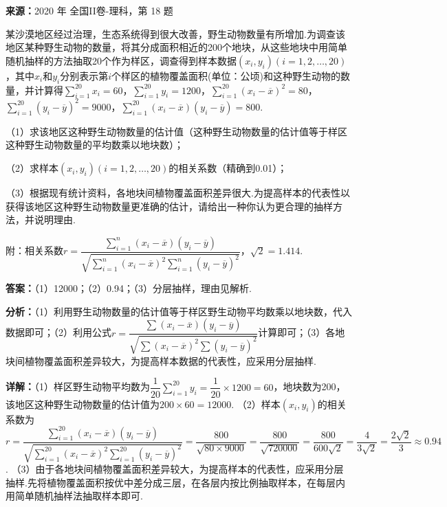 \begin{question}[points=12]
\textbf{来源：}2020 年 全国II卷-理科，第 18 题\par
某沙漠地区经过治理，生态系统得到很大改善，野生动物数量有所增加.为调查该地区某种野生动物的数量，将其分成面积相近的200个地块，从这些地块中用简单随机抽样的方法抽取20个作为样区，调查得到样本数据$(x_i,y_i)(i=1,2,\ldots,20)$，其中$x_i$和$y_i$分别表示第$i$个样区的植物覆盖面积(单位：公顷)和这种野生动物的数量，并计算得$\sum\limits_{i=1}^{20}x_i=60$，$\sum\limits_{i=1}^{20}y_i=1200$，$\sum\limits_{i=1}^{20}(x_i-\overline{x})^2=80$，$\sum\limits_{i=1}^{20}(y_i-\overline{y})^2=9000$，$\sum\limits_{i=1}^{20}(x_i-\overline{x})(y_i-\overline{y})=800$.

（1）求该地区这种野生动物数量的估计值（这种野生动物数量的估计值等于样区这种野生动物数量的平均数乘以地块数）；

（2）求样本$(x_i,y_i)(i=1,2,\ldots,20)$的相关系数（精确到0.01）；

（3）根据现有统计资料，各地块间植物覆盖面积差异很大.为提高样本的代表性以获得该地区这种野生动物数量更准确的估计，请给出一种你认为更合理的抽样方法，并说明理由.

附：相关系数$r=\dfrac{\sum\limits_{i=1}^{n}(x_i-\overline{x})(y_i-\overline{y})}{\sqrt{\sum\limits_{i=1}^{n}(x_i-\overline{x})^2\sum\limits_{i=1}^{n}(y_i-\overline{y})^2}}$，$\sqrt2=1.414$.
\begin{solution}
\textbf{答案：}（1）12000；（2）0.94；（3）分层抽样，理由见解析.

\textbf{分析：}（1）利用野生动物数量的估计值等于样区野生动物平均数乘以地块数，代入数据即可；（2）利用公式$r=\dfrac{\sum(x_i-\overline{x})(y_i-\overline{y})}{\sqrt{\sum(x_i-\overline{x})^2\sum(y_i-\overline{y})^2}}$计算即可；（3）各地块间植物覆盖面积差异较大，为提高样本数据的代表性，应采用分层抽样.

\textbf{详解：}（1）样区野生动物平均数为$\dfrac1{20}\sum_{i=1}^{20}y_i=\dfrac{1}{20}\times1200=60$，地块数为200，该地区这种野生动物数量的估计值为$200\times60=12000$.
（2）样本$(x_i,y_i)$的相关系数为$r=\dfrac{\sum_{i=1}^{20}(x_i-\overline{x})(y_i-\overline{y})}{\sqrt{\sum_{i=1}^{20}(x_i-\overline{x})^2\sum_{i=1}^{20}(y_i-\overline{y})^2}}=\dfrac{800}{\sqrt{80\times9000}}=\dfrac{800}{\sqrt{720000}}=\dfrac{800}{600\sqrt2}=\dfrac{4}{3\sqrt2}=\dfrac{2\sqrt2}{3}\approx0.94$.
（3）由于各地块间植物覆盖面积差异较大，为提高样本的代表性，应采用分层抽样.先将植物覆盖面积按优中差分成三层，在各层内按比例抽取样本，在每层内用简单随机抽样法抽取样本即可.
\end{solution}
\end{question}

